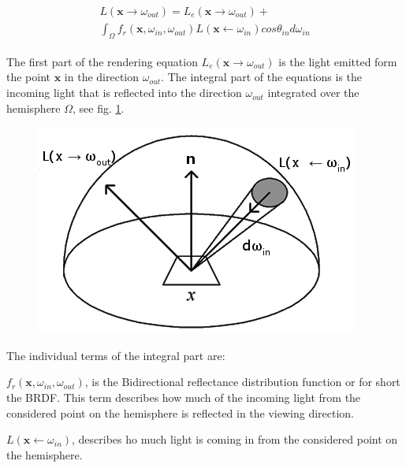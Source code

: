 \documentclass[twocolumn]{article}
\begin{document}
\begin{align}
\label{eq:rendereq}
\begin{split}
	 L(\mathbf{x} \rightarrow \omega_{out}) = L_e(\mathbf{x} \rightarrow \omega_{out}) + \\ \int_{\Omega} f_r(\mathbf{x}, \omega_{in}, \omega_{out})L(\mathbf{x} \leftarrow \omega_{in})cos\theta_{in}d\omega_{in}
\end{split}
\end{align}

The first part of the rendering equation $L_e(\mathbf{x} \rightarrow \omega_{out})$ is the light emitted form the point $\mathbf{x}$ in the direction $\omega_{out}$. The integral part of the equations is the incoming light that is reflected into the  direction $\omega_{out}$ integrated over the hemisphere $\Omega$, see fig. \ref{fig:hemisphere}.

\begin{figure}[ht]
\centering
\includegraphics[width=1.0\linewidth]{pics/hemisphere.png}
\caption{\label{fig:hemisphere} }
\end{figure}

The individual terms of the integral part are:

\vspace*{1em}

$f_r(\mathbf{x}, \omega_{in}, \omega_{out})$, is the Bidirectional reflectance distribution function or for short the BRDF. This term describes how much of the incoming light from the considered point on the hemisphere is reflected in the viewing direction. %

\vspace*{1em}

$L(\mathbf{x} \leftarrow \omega_{in})$, describes ho much light is coming in from the considered point on the hemisphere.
\end{document}
